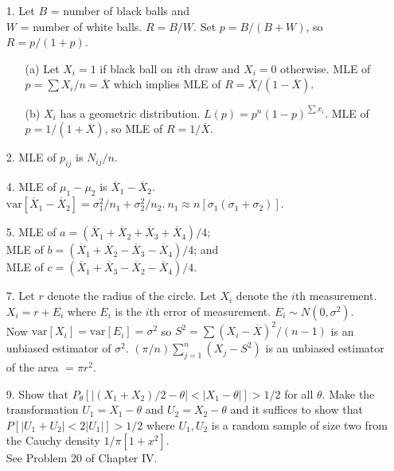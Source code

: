 \begin{enumerate}
	\item[1.] Let $B$ = number of black balls and \\
	$W$ = number of white balls.
	$R = B/W$. Set $p = B/(B+W)$, so $R = p/(1+p)$.
	\begin{enumerate}
		\item[(a)] Let $X_i=1$ if black ball on $i$th draw and $X_i=0$ otherwise.  MLE of $p=\sum X_i/n = \overline{X}$ which implies MLE of $R = \overline{X}/(1-\overline{X})$. 
		\item[(b)] $X_i$ has a geometric distribution. $L(p) = p^n(1-p)^{\sum x_i}$.  MLE of $p=1/(1+\overline{X})$, so MLE of $R = 1/\overline{X}$.
	\end{enumerate}
	
	\item[2.] MLE of $p_{ij}$ is $N_{ij}/n$.
	
	\item[4.] MLE of $\mu_1 - \mu_2$ is $\overline{X}_1-\overline{X}_2$. \\
	$\mbox{var}[\overline{X}_1-\overline{X}_2] = \sigma_1^2/n_1 + \sigma_2^2/n_2.\ n_1\approx n[\sigma_1(\sigma_1+\sigma_2)]$.
	
	\item[5.] MLE of $a = (\overline{X}_1 + \overline{X}_2 + \overline{X}_3 + \overline{X}_4)/4$; \\
	MLE of $b = (\overline{X}_1 + \overline{X}_2 - \overline{X}_3 - \overline{X}_4)/4$; and \\
	MLE of $c = (\overline{X}_1 + \overline{X}_3 - \overline{X}_2 - \overline{X}_4)/4$.
	
	\item[7.] Let $r$ denote the radius of the circle. Let $X_i$ denote the $i$th measurement. \\
	$X_i = r +E_i$ where $E_i$ is the $i$th error of measurement. $E_i\sim N(0,\sigma^2)$. \\
	Now $\mbox{var}[X_i] = \mbox{var}[E_i] = \sigma^2$ so $S^2 = \sum(X_i-\overline{X})^2/(n-1)$ is an unbiased estimator of $\sigma^2$. $(\pi/n)\displaystyle \sum_{j=1}^n(X_j-S^2)$ is an unbiased estimator of the area $= \pi r^2$. 
	
	\item[9.] Show that $P_\theta[\vert(X_1+X_2)/2-\theta\vert < \vert X_1-\theta\vert] > 1/2$ for all $\theta$. Make the transformation $U_1 = X_1-\theta$ and $U_2 = X_2-\theta$ and it suffices to show that $P[\vert U_1+U_2\vert < 2\vert U_1\vert] > 1/2$ where $U_1, U_2$ is a random sample of size two from the Cauchy density $1/\pi[1+x^2]$. \\
	See Problem 20 of Chapter IV. 
	

\end{enumerate}
